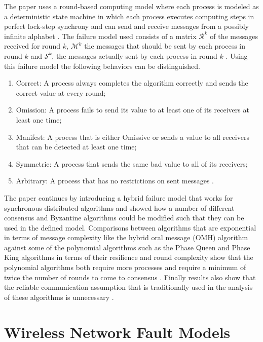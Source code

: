 \documentclass[twoside, conference]{IEEEtran}
\begin{document}
The paper uses a round-based computing model where each process is modeled as a deterministic state machine in which each process executes computing steps in perfect lock-step synchrony and can send and receive messages from a possibly infinite alphabet \cite{Biely2011}.  The failure model used consists of a matrix $\mathcal{R}^k$ of the messages received for round $k$, $\mathcal{M}^k$ the messages that should be sent by each process in round $k$ and $\mathcal{S}^k$, the messages actually sent by each process in round $k$ \cite{Biely2011}.  Using this failure model the following behaviors can be distinguished.
\begin{enumerate}
	\item Correct: A process always completes the algorithm correctly and sends the correct value at every round;
	\item Omission: A process fails to send its value to at least one of its receivers at least one time;
	\item Manifest: A process that is either Omissive or sends a value to all receivers that can be detected at least one time;
	\item Symmetric: A process that sends the same bad value to all of its receivers;
	\item Arbitrary: A process that has no restrictions on sent messages \cite{Biely2011}.
\end{enumerate}
The paper continues by introducing a hybrid failure model that works for synchronous distributed algorithms \cite{Biely2011} and showed how a number of different consensus and Byzantine algorithms could be modified such that they can be used in the defined model.  Comparisons between algorithms that are exponential in terms of message complexity like the hybrid oral message (OMH) algorithm against some of the polynomial algorithms such as the Phase Queen and Phase King algorithms in terms of their resilience and round complexity show that the polynomial algorithms both require more processes and require a minimum of twice the number of rounds to come to consensus \cite{Biely2011}.  Finally results also show that the reliable communication assumption that is traditionally used in the analysis of these algorithms is unnecessary \cite{Biely2011}.


\section{Wireless Network Fault Models}\label{sec:wireless-faultmodels}
\end{document}
